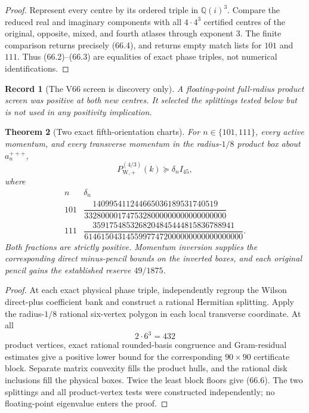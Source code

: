 \documentclass[11pt,oneside]{article}
\newtheorem{theorem}{Theorem}[section]
\newtheorem{record}[theorem]{Record}
\theoremstyle{definition}
\theoremstyle{remark}
\begin{document}
\begin{proof}
Represent every centre by its ordered triple in
\(\mathbb Q(i)^3\).  Compare the reduced real and imaginary
components with all \(4\cdot4^3\) certified centres of the original,
opposite, mixed, and fourth atlases through exponent \(3\).  The
finite comparison returns precisely (66.4), and returns empty match
lists for \(101\) and \(111\).  Thus (66.2)--(66.3) are equalities
of exact phase triples, not numerical identifications.
\end{proof}

\begin{record}[The V66 screen is discovery only]
\label{rec:newv66-screen}
A floating-point full-radius product screen was positive at both
new centres.  It selected the splittings tested below but is not
used in any positivity implication.
\end{record}

\begin{theorem}[Two exact fifth-orientation charts]
\label{thm:newv66-two-charts}
For \(n\in\{101,111\}\), every active momentum, and every transverse
momentum in the radius-\(1/8\) product box about
\(a_n^{+++}\),
\[
 P_{\mathrm W,+}^{(4/3)}(k)\succeq\delta_n I_{45},   \tag{66.5}
\]
where
\[
\begin{array}{c|c}
n&\delta_n\\ \hline
101&
\dfrac{140995411244665036189531740519}
 {3328000017475328000000000000000000}\\[6pt]
111&
\dfrac{3591754853268204845444815836788941}
 {61461504314559977472000000000000000000}.
\end{array}                                           \tag{66.6}
\]
Both fractions are strictly positive.  Momentum inversion supplies
the corresponding direct minus-pencil bounds on the inverted
boxes, and each original pencil gains the established reserve
\(49/1875\).
\end{theorem}

\begin{proof}
At each exact physical phase triple, independently regroup the
Wilson direct-plus coefficient bank and construct a rational
Hermitian splitting.  Apply the radius-\(1/8\) rational six-vertex
polygon in each local transverse coordinate.  At all
\[
 2\cdot6^3=432                                        \tag{66.7}
\]
product vertices, exact rational rounded-basis congruence and
Gram-residual estimates give a positive lower bound for the
corresponding \(90\times90\) certificate block.  Separate matrix
convexity fills the product hulls, and the rational disk inclusions
fill the physical boxes.  Twice the least block floors give
(66.6).  The two splittings and all product-vertex tests were
constructed independently; no floating-point eigenvalue enters the
proof.
\end{proof}
\end{document}
